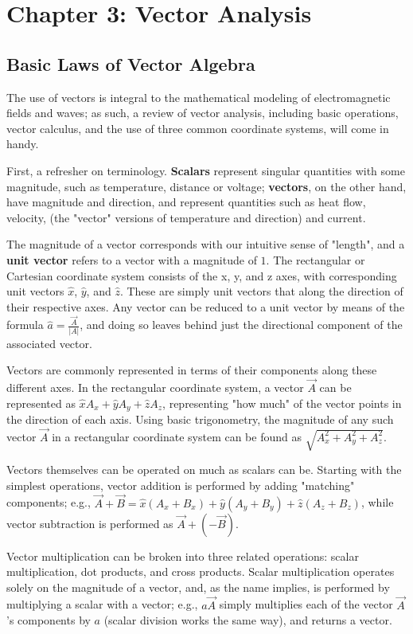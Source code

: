 \documentclass{article}
\begin{document}
\setcounter{section}{2}
\section{Chapter 3: Vector Analysis}
\setcounter{subsection}{0}
\subsection{Basic Laws of Vector Algebra}
The use of vectors is integral to the mathematical modeling of electromagnetic fields and waves; as such, a review of vector analysis, including basic operations, vector calculus, and the use of three common coordinate systems, will come in handy.

First, a refresher on terminology. \textbf{Scalars} represent singular quantities with some magnitude, such as temperature, distance or voltage; \textbf{vectors}, on the other hand, have magnitude and direction, and represent quantities such as heat flow, velocity, (the "vector" versions of temperature and direction) and current.

The magnitude of a vector corresponds with our intuitive sense of "length", and a \textbf{unit vector} refers to a vector with a magnitude of $1$. The rectangular or Cartesian coordinate system consists of the x, y, and z axes, with corresponding unit vectors $\hat{x}$, $\hat{y}$, and $\hat{z}$. These are simply unit vectors that along the direction of their respective axes. Any vector can be reduced to a unit vector by means of the formula $\hat{a} = \frac{\vec{A}}{|A|}$, and doing so leaves behind just the directional component of the associated vector.

Vectors are commonly represented in terms of their components along these different axes. In the rectangular coordinate system, a vector $\vec{A}$ can be represented as $\hat{x}A_{x} + \hat{y}A_{y} + \hat{z}A_{z}$, representing "how much" of the vector points in the direction of each axis. Using basic trigonometry, the magnitude of any such vector $\vec{A}$ in a rectangular coordinate system can be found as $\sqrt{A_x^2 + A_y^2 + A_z^2}$.

Vectors themselves can be operated on much as scalars can be. Starting with the simplest operations, vector addition is performed by adding "matching" components; e.g., $\vec{A} + \vec{B} = \hat{x}(A_{x}+B_{x}) + \hat{y}(A_{y}+B_{y}) + \hat{z}(A_{z}+B_{z})$, while vector subtraction is performed as $\vec{A} + (-\vec{B})$. 

Vector multiplication can be broken into three related operations: scalar multiplication, dot products, and cross products. Scalar multiplication operates solely on the magnitude of a vector, and, as the name implies, is performed by multiplying a scalar with a vector; e.g., $a\vec{A}$ simply multiplies each of the vector $\vec{A}$'s components by $a$ (scalar division works the same way), and returns a vector.
\end{document}
